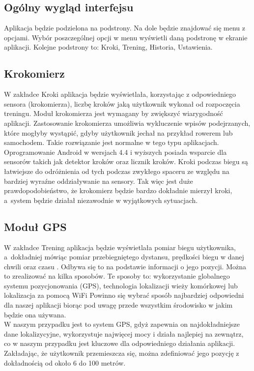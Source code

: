 \subsection{Ogólny wygląd interfejsu}  %

\hspace{0.60cm}Aplikacja będzie podzielona na podstrony. Na dole będzie znajdować się menu z opcjami. Wybór poszczególnej opcji w menu wyświetli daną podstronę w ekranie aplikacji. Kolejne podstrony to: Kroki, Trening, Historia, Ustawienia.

\subsection{Krokomierz}  %

\hspace{0.60cm}W zakładce Kroki aplikacja będzie wyświetlała, korzystając z odpowiedniego sensora (krokomierza), liczbę kroków jaką użytkownik wykonał od rozpoczęcia treningu. Moduł krokomierza jest wymagany by zwiększyć wiarygodność aplikacji. Zastosowanie krokomierza umożliwia wykluczenie wpisów podejrzanych, które mogłyby wystąpić, gdyby użytkownik jechał na przykład rowerem lub samochodem. Takie rozwiązanie jest normalne w tego typu aplikacjach. Oprogramowanie Android w wersjach 4.4 i wyższych posiada wsparcie dla sensorów takich jak detektor kroków oraz licznik kroków. Kroki podczas biegu są łatwiejsze do odróżnienia od tych podczas zwykłego spaceru ze względu na bardziej wyraźne oddziaływanie na sensory. Tak więc jest duże prawdopodobieństwo, że krokomierz będzie bardzo dokładnie mierzył kroki, a~system będzie działał niezawodnie w wyjątkowych sytuacjach.

\subsection{Moduł GPS}  %

\hspace{0.60cm}W zakładce Trening aplikacja będzie wyświetlała pomiar biegu użytkownika, a~dokładniej mówiąc pomiar przebiegniętego dystansu, prędkości biegu w danej chwili oraz czasu . Odbywa się to na podstawie informacji o jego pozycji. Można to zrealizować na kilka sposobów. Te sposoby to: wykorzystanie globalnego systemu pozycjonowania (GPS), technologia lokalizacji wieży komórkowej lub lokalizacja za pomocą WiFi Powinno się wybrać sposób najbardziej odpowiedni dla naszej aplikacji biorąc pod uwagę przede wszystkim środowisko w jakim będzie ona używana. \\ 
W naszym przypadku jest to system GPS, gdyż zapewnia on najdokładniejsze dane lokalizycyjne, wykorzystuje najwięcej mocy i działa najlepiej na zewnątrz, co w naszym przypadku jest kluczowe dla odpowiedniego działania aplikacji. Zakładając, że użytkownik przemieszcza się, można zdefiniować jego pozycję z dokładnością od około 6 do 100 metrów.

